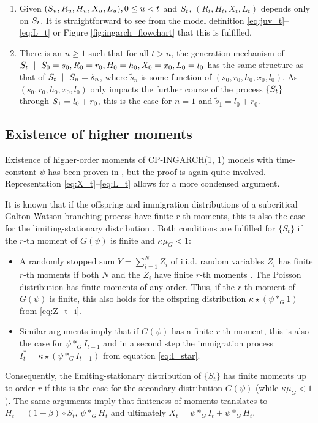 \documentclass[review]{elsarticle}
\begin{document}
\begin{enumerate}
\item Given $(S_u, R_u, H_u, X_u, L_u), 0 \leq u < t$ and $S_t$, $(R_t, H_t, X_t, L_t)$ depends only on $S_t$. It is straightforward to see from the model definition \eqref{eq:juv_t}--\eqref{eq:L_t} or Figure \ref{fig:ingarch_flowchart} that this is fulfilled.
\item There is an $n \geq 1$ such that for all $t > n$, the generation mechanism of $\juv_t \ \mid \ \juv_0 = s_0, R_0 = r_0, H_0 = h_0, X_0 = x_0, L_0 = l_0$ has the same structure as that of $\juv_t \ \mid \ \juv_n = \tilde{s}_n$, where $\tilde{s}_n$ is some function of $(s_0, r_0, h_0, x_0, l_0)$. As $(s_0, r_0, h_0, x_0, l_0)$ only impacts the further course of the process $\{S_t\}$ through $S_1 = l_0 + r_0$, this is the case for $n = 1$ and $\tilde{s}_1 = l_0 + r_0$.
\end{enumerate}

\subsection{Existence of higher moments}

Existence of higher-order moments of CP-INGARCH(1, 1) models with time-constant $\psi$ has been proven in \cite{Silva2016}, but the proof is again quite involved. Representation \eqref{eq:X_t}--\eqref{eq:L_t} allows for a more condensed argument.

It is known that if the offspring and immigration distributions of a subcritical Galton-Watson branching process have finite $r$-th moments, this is also the case for the limiting-stationary distribution \cite[Sec. 4]{Lange1981}. Both conditions are fulfilled for $\{S_t\}$ if the $r$-th moment of $G(\psi)$ is finite and $\kappa\mu_G < 1$:

\begin{itemize}
\item A randomly stopped sum $Y = \sum_{i = 1}^N Z_i$ of i.i.d. random variables $Z_i$ has finite $r$-th moments if both $N$ and the $Z_i$ have finite $r$-th moments \cite[Theorem 5.2]{Gut2009}. The Poisson distribution has finite moments of any order. Thus, if the $r$-th moment of $G(\psi)$ is finite, this also holds for the offspring distribution $\kappa \star (\psi *_G 1)$ from \eqref{eq:Z_t_i}.
\item Similar arguments imply that if $G(\psi)$ has a finite $r$-th moment, this is also the case for $\psi *_G I_{t - 1}$ and in a second step the immigration process $I^*_t = \kappa \star(\psi *_G I_{t - 1})$ from equation \eqref{eq:I_star}.
\end{itemize}
Consequently, the limiting-stationary distribution of $\{S_t\}$ has finite moments up to order $r$ if this is the case for the secondary distribution $G(\psi)$ (while $\kappa\mu_G < 1$). The same arguments imply that finiteness of moments translates to $H_t = (1 - \beta) \circ S_t$, $\psi *_G H_t$ and ultimately $X_t = \psi *_G I_t + \psi *_G H_t$.
\end{document}
